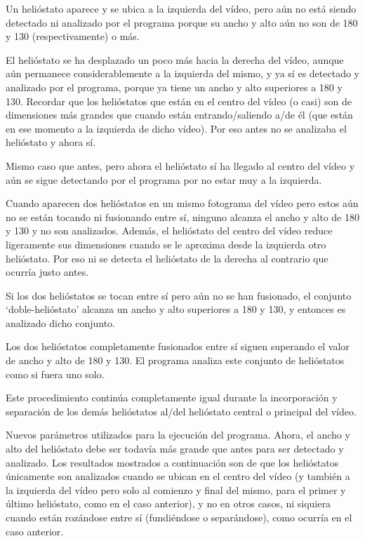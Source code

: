\documentclass[12pt]{article}
\begin{document}
Un helióstato aparece y se ubica a la izquierda del vídeo, pero aún no está siendo detectado ni analizado por el programa porque su ancho y alto aún no son de 180 y 130 (respectivamente) o más.




El helióstato se ha desplazado un poco más hacia la derecha del vídeo, aunque aún permanece considerablemente a la izquierda del mismo, y ya sí es detectado y analizado por el programa, porque ya tiene un ancho y alto superiores a 180 y 130. Recordar que los helióstatos que están en el centro del vídeo (o casi) son de dimensiones más grandes que cuando están entrando/saliendo a/de él (que están en ese momento a la izquierda de dicho vídeo). Por eso antes no se analizaba el helióstato y ahora sí.




Mismo caso que antes, pero ahora el helióstato sí ha llegado al centro del vídeo y aún se sigue detectando por el programa por no estar muy a la izquierda.




Cuando aparecen dos helióstatos en un mismo fotograma del vídeo pero estos aún no se están tocando ni fusionando entre sí, ninguno alcanza el ancho y alto de 180 y 130 y no son analizados. Además, el helióstato del centro del vídeo reduce ligeramente sus dimensiones cuando se le aproxima desde la izquierda otro helióstato. Por eso ni se detecta el helióstato de la derecha al contrario que ocurría justo antes.



Si los dos helióstatos se tocan entre sí pero aún no se han fusionado, el conjunto ‘doble-helióstato’ alcanza un ancho y alto superiores a 180 y 130, y entonces es analizado dicho conjunto.




Los dos helióstatos completamente fusionados entre sí siguen superando el valor de ancho y alto de 180 y 130. El programa analiza este conjunto de helióstatos como si fuera uno solo.

Este procedimiento continúa completamente igual durante la incorporación y separación de los demás helióstatos al/del helióstato central o principal del vídeo.




Nuevos parámetros utilizados para la ejecución del programa. Ahora, el ancho y alto del helióstato debe ser todavía más grande que antes para ser detectado y analizado. Los resultados mostrados a continuación son de que los helióstatos únicamente son analizados cuando se ubican en el centro del vídeo (y también a la izquierda del vídeo pero solo al comienzo y final del mismo, para el primer y último helióstato, como en el caso anterior), y no en otros casos, ni siquiera cuando están rozándose entre sí (fundiéndose o separándose), como ocurría en el caso anterior.
\end{document}
